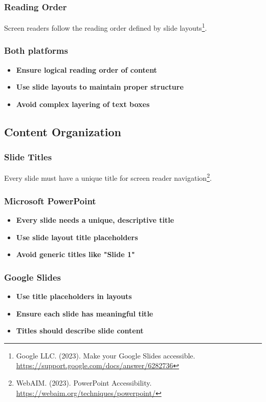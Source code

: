 \subsubsection{Reading Order}
Screen readers follow the reading order defined by slide layouts\footnote{Google LLC. (2023). Make your Google Slides accessible. \url{https://support.google.com/docs/answer/6282736}}.

\subsubsection{Both platforms}
\vspace{1em}
\begin{itemize}
\item \textbf{Ensure logical reading order of content}
\item \textbf{Use slide layouts to maintain proper structure}
\item \textbf{Avoid complex layering of text boxes}
\end{itemize}
\vspace{1em}

\subsection{Content Organization}

\subsubsection{Slide Titles}
Every slide must have a unique title for screen reader navigation\footnote{WebAIM. (2023). PowerPoint Accessibility. \url{https://webaim.org/techniques/powerpoint/}}.

\subsubsection{Microsoft PowerPoint}
\vspace{1em}
\begin{itemize}
\item \textbf{Every slide needs a unique, descriptive title}
\item \textbf{Use slide layout title placeholders}
\item \textbf{Avoid generic titles like "Slide 1"}
\end{itemize}
\vspace{1em}

\subsubsection{Google Slides}
\vspace{1em}
\begin{itemize}
\item \textbf{Use title placeholders in layouts}
\item \textbf{Ensure each slide has meaningful title}
\item \textbf{Titles should describe slide content}
\end{itemize}
\vspace{1em}

